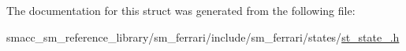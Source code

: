 The documentation for this struct was generated from the following file\+:\begin{DoxyCompactItemize}
\item 
smacc\+\_\+sm\+\_\+reference\+\_\+library/sm\+\_\+ferrari/include/sm\+\_\+ferrari/states/\hyperlink{sm__ferrari_2include_2sm__ferrari_2states_2st__state__2_8h}{st\+\_\+state\+\_.\+h}\end{DoxyCompactItemize}
